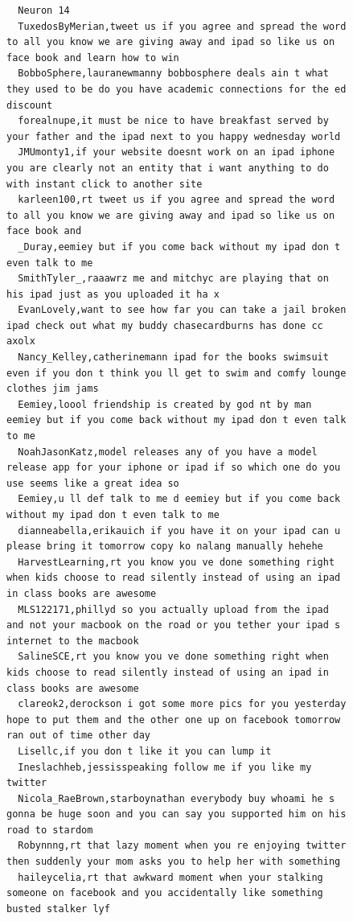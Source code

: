 \begin{figure}[htpb]
\begin{verbatim}
  Neuron 14
  TuxedosByMerian,tweet us if you agree and spread the word to all you know we are giving away and ipad so like us on face book and learn how to win
  BobboSphere,lauranewmanny bobbosphere deals ain t what they used to be do you have academic connections for the ed discount
  forealnupe,it must be nice to have breakfast served by your father and the ipad next to you happy wednesday world
  JMUmonty1,if your website doesnt work on an ipad iphone you are clearly not an entity that i want anything to do with instant click to another site
  karleen100,rt tweet us if you agree and spread the word to all you know we are giving away and ipad so like us on face book and
  _Duray,eemiey but if you come back without my ipad don t even talk to me
  SmithTyler_,raaawrz me and mitchyc are playing that on his ipad just as you uploaded it ha x
  EvanLovely,want to see how far you can take a jail broken ipad check out what my buddy chasecardburns has done cc axolx
  Nancy_Kelley,catherinemann ipad for the books swimsuit even if you don t think you ll get to swim and comfy lounge clothes jim jams
  Eemiey,loool friendship is created by god nt by man eemiey but if you come back without my ipad don t even talk to me
  NoahJasonKatz,model releases any of you have a model release app for your iphone or ipad if so which one do you use seems like a great idea so
  Eemiey,u ll def talk to me d eemiey but if you come back without my ipad don t even talk to me
  dianneabella,erikauich if you have it on your ipad can u please bring it tomorrow copy ko nalang manually hehehe
  HarvestLearning,rt you know you ve done something right when kids choose to read silently instead of using an ipad in class books are awesome
  MLS122171,phillyd so you actually upload from the ipad and not your macbook on the road or you tether your ipad s internet to the macbook
  SalineSCE,rt you know you ve done something right when kids choose to read silently instead of using an ipad in class books are awesome
  clareok2,derockson i got some more pics for you yesterday hope to put them and the other one up on facebook tomorrow ran out of time other day
  Lisellc,if you don t like it you can lump it
  Ineslachheb,jessisspeaking follow me if you like my twitter
  Nicola_RaeBrown,starboynathan everybody buy whoami he s gonna be huge soon and you can say you supported him on his road to stardom
  Robynnng,rt that lazy moment when you re enjoying twitter then suddenly your mom asks you to help her with something
  haileycelia,rt that awkward moment when your stalking someone on facebook and you accidentally like something busted stalker lyf

\end{verbatim}
\end{figure}

